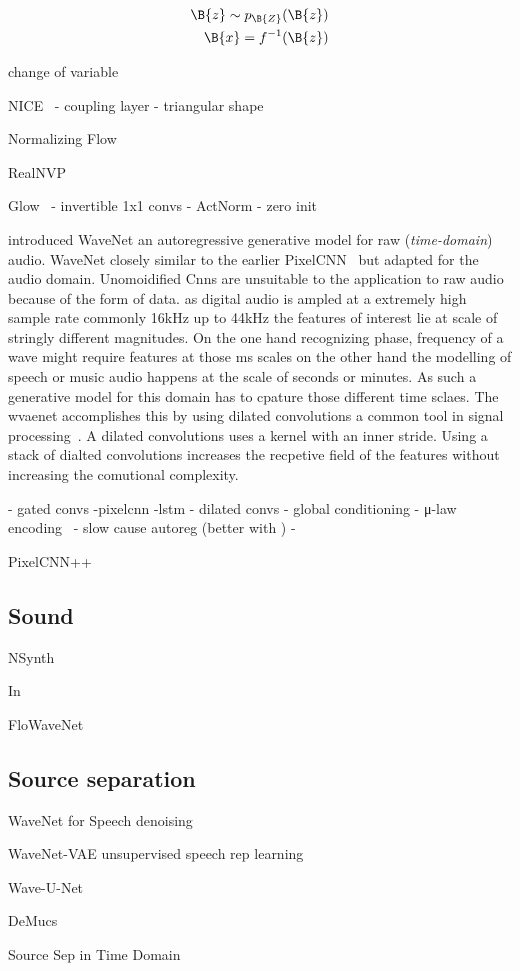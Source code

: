 \begin{align}
    \B{z}\sim p_{\B{Z}}(\B{z})\\
    \B{x} = f^{-1}(\B{z})
\end{align}

change of variable


NICE~\cite{dinhNICE2015}
- coupling layer
- triangular shape

Normalizing Flow~\cite{rezendeVariational2016}


RealNVP~\cite{dinhDensity2017}

Glow~\cite{kingmaGlow2018}
- invertible 1x1 convs
- ActNorm
- zero init


\cite{vandenoordWaveNet2016} introduced WaveNet an autoregressive generative model for raw (\textit{time-domain}) audio. WaveNet closely similar to the earlier PixelCNN~\cite{vandenoordConditional2016} but adapted for the audio domain. Unomoidified Cnns are unsuitable to the application to raw audio because of the form of data. as digital audio is ampled at a extremely high sample rate commonly 16kHz up to 44kHz the features of interest lie at scale of stringly different magnitudes. On the one hand recognizing phase, frequency of a wave might require features at those ms scales on the other hand the modelling of speech or music audio happens at the scale of seconds or minutes. As such a generative model for this domain has to cpature those different time sclaes. The wvaenet accomplishes this by using dilated convolutions a common tool in signal processing~\cite{dutilleuxImplementation1990}. A dilated convolutions uses a kernel with an inner stride. Using a stack of dialted convolutions increases the recpetive field of the features without increasing the comutional complexity.

- gated convs -pixelcnn -lstm\cite{hochreiterLong1997a}
- dilated convs
- global conditioning
- μ-law encoding~\cite{Recommendation1988}
- slow cause autoreg (better with \cite{paineFast2016})
-

PixelCNN++~\cite{salimansPixelCNN2017}


\subsection{Sound}
NSynth~\cite{kalchbrennerEfficient2018}

In~\cite{prengerWaveGlow2018}

FloWaveNet~\cite{kimFloWaveNet2019a}

\subsection{Source separation}
WaveNet for Speech denoising\cite{rethageWavenet2018}

WaveNet-VAE unsupervised speech rep learning\cite{chorowskiUnsupervised2019}

Wave-U-Net\cite{danielstollerWaveUNet2018}

DeMucs\cite{defossezDemucs2019}

Source Sep in Time Domain\cite{lluisEndtoend2019}
